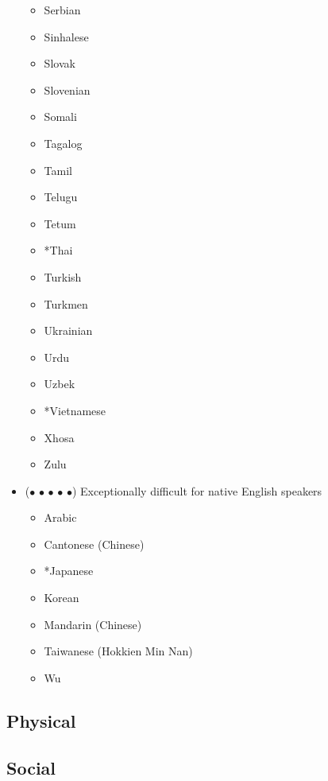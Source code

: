 \documentclass["../Misguided by Starlight.tex"]{subfiles}
\begin{document}
\begin{itemize}
\begin{itemize}
			\item Serbian
			\item Sinhalese
			\item Slovak
			\item Slovenian
			\item Somali
			\item Tagalog
			\item Tamil
			\item Telugu
			\item Tetum
			\item *Thai
			\item Turkish
			\item Turkmen
			\item Ukrainian
			\item Urdu
			\item Uzbek
			\item *Vietnamese
			\item Xhosa
			\item Zulu
		\end{itemize}

		\item ($\bullet$ $\bullet$ $\bullet$ $\bullet$ $\bullet$) Exceptionally difficult for native English speakers
		\begin{itemize}
			\item Arabic
			\item Cantonese (Chinese)
			\item *Japanese
			\item Korean
			\item Mandarin (Chinese)
			\item Taiwanese (Hokkien Min Nan)
			\item Wu
		\end{itemize}
	\end{itemize}
	
\subsection{Physical}
\subsection{Social}
\end{document}
